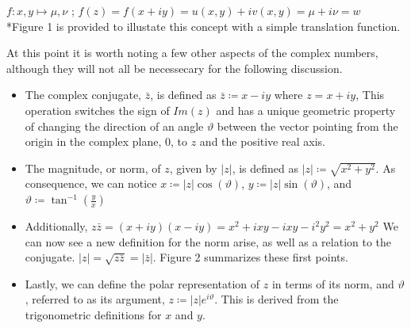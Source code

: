 \documentclass[a4paper,man,natbib]{apa6}
\begin{document}
\begin{center}

      $ f : x,y \mapsto \mu,\nu $ ; $ f(z) = f(x+iy) = u(x,y) + iv(x,y) = \mu + i\nu = w $ \\
     *Figure 1 is provided to illustate this concept with a simple translation function.

\end{center}

At this point it is worth noting a few other aspects of the complex numbers, although they will not all be necessecary for the following discussion. 

\begin{itemize}

\item The complex conjugate, $ \bar{z} $, is defined as $ \bar{z} \coloneqq x - iy $ where $ z = x +iy $, 
This operation switches the sign of $ Im(z) $ and has a unique geometric property of changing the direction of an angle $ \vartheta $ 
between the vector pointing from the origin in the complex plane, 0, to $z$ and the positive real axis.

\item The magnitude, or norm, of $ z $, given by $ |z| $, is defined as $ |z| \coloneqq \sqrt{x^2 + y^2} $.
As consequence, we can notice $ x \coloneqq  |z|\cos(\vartheta) $, $ y \coloneqq  |z|\sin(\vartheta) $, and $ \vartheta \coloneqq  \tan^{-1}(\frac{y}{x}) $

\item Additionally, $ z\bar{z} = (x + iy)(x - iy) = x^2 +ixy - ixy - i^2y^2 = x^2 + y^2$  We can now see a new definition for the norm arise, as well as a relation to the conjugate.
$ |z| = \sqrt{z\bar{z}} = |\bar{z}| $. Figure 2 summarizes these first points.

\item Lastly, we can define the polar representation of $ z $ in terms of its norm, and $\vartheta$, referred to as its argument,  $ z \coloneqq  |z|e^{i\vartheta} $. This is derived from the trigonometric definitions for $ x $ and $ y $.  

\end{itemize}
\end{document}
